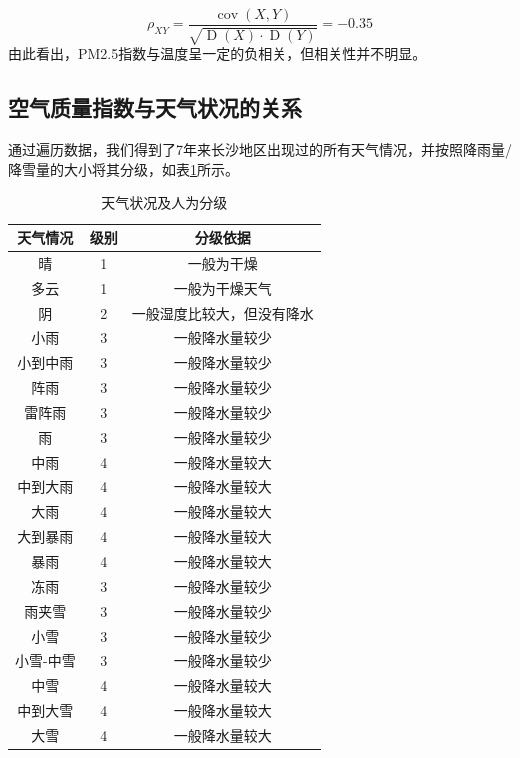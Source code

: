 \documentclass[UTF8,a4paper,10pt]{article}
\begin{document}
\begin{equation}
\rho_{XY} =  \frac{\operatorname{cov}(X, Y)}{\sqrt{\operatorname{D}(X) \cdot \operatorname{D}(Y)}} = -0.35
\end{equation}
\indent 由此看出，PM2.5指数与温度呈一定的负相关，但相关性并不明显。

\subsection{空气质量指数与天气状况的关系}

\indent 通过遍历数据，我们得到了7年来长沙地区出现过的所有天气情况，并按照降雨量/降雪量的大小将其分级，如表\ref{table1}所示。

\begin{table}[]
    \caption{天气状况及人为分级}
    \vspace{20pt}
    \centering
    \begin{tabular}{ccc}
        \toprule  %
        天气情况& 级别& 分级依据\\
        \midrule  %
        晴& 1& 一般为干燥\\
        多云& 1& 一般为干燥天气\\
        阴& 2& 一般湿度比较大，但没有降水\\
        小雨& 3& 一般降水量较少\\
        小到中雨& 3& 一般降水量较少\\
        阵雨& 3& 一般降水量较少\\
        雷阵雨& 3& 一般降水量较少\\
        雨& 3& 一般降水量较少\\
        中雨& 4& 一般降水量较大\\
        中到大雨& 4& 一般降水量较大\\
        大雨& 4& 一般降水量较大\\
        大到暴雨& 4& 一般降水量较大\\
        暴雨& 4& 一般降水量较大\\
        冻雨& 3& 一般降水量较少\\
        雨夹雪& 3& 一般降水量较少\\
        小雪& 3& 一般降水量较少\\
        小雪-中雪& 3& 一般降水量较少\\
        中雪& 4& 一般降水量较大\\
        中到大雪& 4& 一般降水量较大\\
        大雪& 4& 一般降水量较大\\
        \bottomrule %
    \end{tabular}
    \label{table1}
\end{table}
\end{document}
